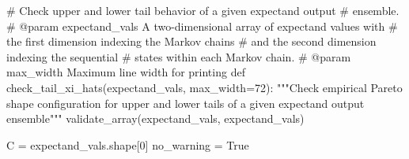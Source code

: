 \documentclass[
  letterpaper,
  DIV=11,
  numbers=noendperiod]{scrartcl}
\newenvironment{Shaded}{\begin{snugshade}}{\end{snugshade}}
\newcommand{\CommentTok}[1]{\textcolor[rgb]{0.37,0.37,0.37}{#1}}
\newcommand{\DecValTok}[1]{\textcolor[rgb]{0.68,0.00,0.00}{#1}}
\newcommand{\KeywordTok}[1]{\textcolor[rgb]{0.00,0.23,0.31}{#1}}
\newcommand{\NormalTok}[1]{\textcolor[rgb]{0.00,0.23,0.31}{#1}}
\newcommand{\OperatorTok}[1]{\textcolor[rgb]{0.37,0.37,0.37}{#1}}
\newcommand{\StringTok}[1]{\textcolor[rgb]{0.13,0.47,0.30}{#1}}
\newcommand{\VariableTok}[1]{\textcolor[rgb]{0.07,0.07,0.07}{#1}}
\begin{document}
\begin{Shaded}
\begin{Highlighting}[]
\CommentTok{\# Check upper and lower tail behavior of a given expectand output}
\CommentTok{\# ensemble.}
\CommentTok{\# @param expectand\_vals A two{-}dimensional array of expectand values with}
\CommentTok{\#                       the first dimension indexing the Markov chains}
\CommentTok{\#                       and the second dimension indexing the sequential}
\CommentTok{\#                       states within each Markov chain.}
\CommentTok{\# @param max\_width Maximum line width for printing}
\KeywordTok{def}\NormalTok{ check\_tail\_xi\_hats(expectand\_vals, max\_width}\OperatorTok{=}\DecValTok{72}\NormalTok{):}
  \CommentTok{"""Check empirical Pareto shape configuration for upper and lower }
\CommentTok{     tails of a given expectand output ensemble"""}
\NormalTok{  validate\_array(expectand\_vals, }\StringTok{\textquotesingle{}expectand\_vals\textquotesingle{}}\NormalTok{)}
  
\NormalTok{  C }\OperatorTok{=}\NormalTok{ expectand\_vals.shape[}\DecValTok{0}\NormalTok{]}
\NormalTok{  no\_warning }\OperatorTok{=} \VariableTok{True}
  

\end{Highlighting}
\end{Shaded}
\end{document}
